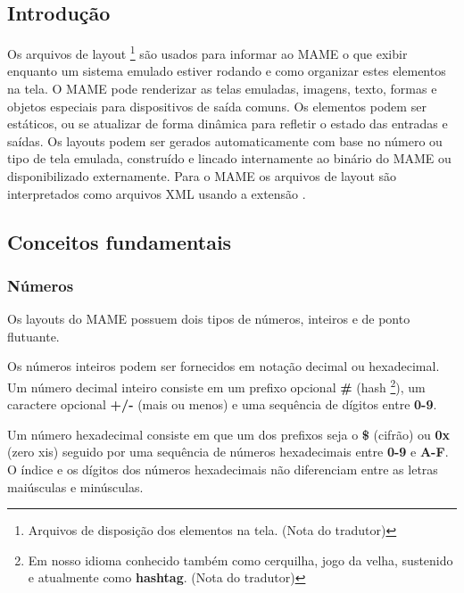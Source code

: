 \documentclass[letterpaper,10pt,brazil]{sphinxmanual}
\begin{document}
\subsection{Introdução}
\label{techspecs/layout_files:layout-intro}\label{techspecs/layout_files:introducao}
Os arquivos de layout \footnote[1]{\sphinxAtStartFootnote%
Arquivos de disposição dos elementos na tela. (Nota do tradutor)
} são usados para informar ao MAME o que exibir
enquanto um sistema emulado estiver rodando e como organizar estes
elementos na tela. O MAME pode renderizar as telas emuladas, imagens,
texto, formas e objetos especiais para dispositivos de saída comuns.
Os elementos podem ser estáticos, ou se atualizar de forma dinâmica para
refletir o estado das entradas e saídas.
Os layouts podem ser gerados automaticamente com base no número ou tipo
de tela emulada, construído e lincado internamente ao binário do MAME ou
disponibilizado externamente. Para o MAME os arquivos de layout são
interpretados como arquivos XML usando a extensão .


\subsection{Conceitos fundamentais}
\label{techspecs/layout_files:layout-concepts}\label{techspecs/layout_files:conceitos-fundamentais}

\subsubsection{Números}
\label{techspecs/layout_files:numeros}\label{techspecs/layout_files:layout-concepts-numbers}
Os layouts do MAME possuem dois tipos de números, inteiros e de ponto
flutuante.

Os números inteiros podem ser fornecidos em notação decimal ou
hexadecimal. Um número decimal inteiro consiste em um prefixo opcional
\textbf{\#} (hash \footnote[2]{\sphinxAtStartFootnote%
Em nosso idioma conhecido também como
cerquilha, jogo da velha, sustenido e atualmente como
\textbf{hashtag}. (Nota do tradutor)
}), um caractere opcional \textbf{+/-} (mais ou menos) e uma
sequência de dígitos entre \textbf{0-9}.

Um número hexadecimal consiste em que um dos prefixos
seja o \textbf{\$} (cifrão) ou \textbf{0x} (zero xis) seguido por uma sequência de
números hexadecimais entre \textbf{0-9} e \textbf{A-F}. O índice e os dígitos dos
números hexadecimais não diferenciam entre as letras maiúsculas e
minúsculas.
\end{document}
